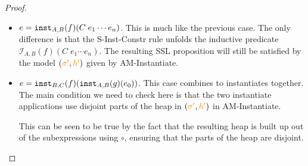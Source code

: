 \begin{proof}
\begin{itemize}



      \item $e = \texttt{inst}_{A,B}(f)(C\; e_1 \cdots e_n)$.
        This is much like the previous case. The only difference is that the {\sc S-Inst-Constr} rule
        unfolds the inductive predicate $\mathcal{I}_{A,B}(f)(C\; e_1 \cdots e_n)$. The resulting SSL proposition
        will still be satisfied by the model $({\color{orange} \sigma'}, {\color{orange} h'})$ given by {\sc AM-Instantiate}.

      \item $e = \texttt{inst}_{B,C}(f)(\texttt{inst}_{A,B}(g)(e_0))$.
        This case combines to instantiates together. The main condition we need to check here is that the
        two instantiate applications use disjoint parts of the heap in $({\color{orange} \sigma'}, {\color{orange} h'})$ in {\sc AM-Instantiate}.

        This can be seen to be true by the fact that the resulting heap is built up out of the subexpressions
        using $\circ$, ensuring that the parts of the heap are disjoint.
  \end{itemize}
\end{proof}
